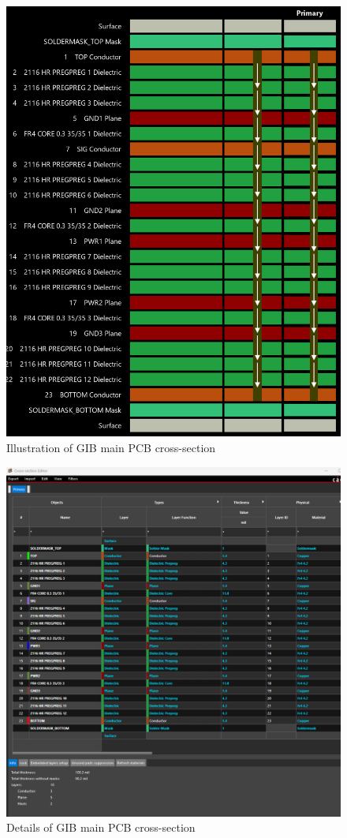 \documentclass[fleqn,12pt,a4paper]{olplainarticle}
\begin{document}
\begin{figure}
    \centering
    \includegraphics[width=0.8\linewidth]{gps_interface_board_ml_v97_cross_section_figure.png}
    \caption{Illustration of GIB main PCB cross-section}
    \label{fig:gib_main_pcb_cross_section_figure}
\end{figure}

\begin{figure}
    \centering
    \includegraphics[width=0.8\linewidth]{gps_interface_board_ml_v97_cross_section_allegro_window.png}
    \caption{Details of GIB main PCB cross-section}
    \label{fig:gib_main_pcb_cross_section_details}
\end{figure}
\end{document}
